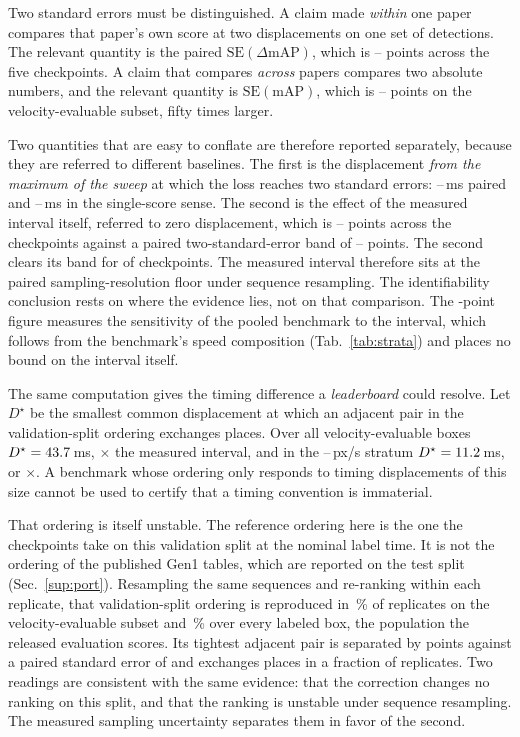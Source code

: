 \documentclass[10pt,twocolumn,letterpaper]{article}
\begin{document}
Two standard errors must be distinguished. A claim made \emph{within} one paper compares
that paper's own score at two displacements on one set of detections. The relevant
quantity is the paired $\mathrm{SE}(\Delta\mathrm{mAP})$, which is \seDmapLo--\seDmapHi{}
points across the five checkpoints. A claim that compares \emph{across} papers compares two
absolute numbers, and the relevant quantity is $\mathrm{SE}(\mathrm{mAP})$, which is
\seMapLo--\seMapHi{} points on the velocity-evaluable subset, fifty times larger.

Two quantities that are easy to conflate are therefore reported separately, because they
are referred to different baselines. The first is the displacement \emph{from the maximum
of the sweep} at which the loss reaches two standard errors: \resPairedLo--\resPairedHi\,ms
paired and \resAbsLo--\resAbsHi\,ms in the single-score sense. The second is the effect of
the measured interval itself, referred to zero displacement, which is
\effTauLo--\effTauHi{} points across the \rankCkpts{} checkpoints against a paired
two-standard-error band of \twoSeDmapLo--\twoSeDmapHi{} points. The second clears its band
for \effTauResolved{} of \rankCkpts{} checkpoints. The measured interval therefore sits at
the paired sampling-resolution floor under sequence resampling. The identifiability conclusion
rests on where the evidence lies, not on that comparison. The
\mapCost{}-point figure measures the sensitivity of the pooled benchmark to the interval,
which follows from the benchmark's speed composition (Tab.~\ref{tab:strata}) and places no bound on
the interval itself.

The same computation gives the timing difference a \emph{leaderboard} could resolve. Let
$D^{\star}$ be the smallest common displacement at which an adjacent pair in the
validation-split ordering exchanges places. Over all velocity-evaluable boxes $D^{\star}=43.7\,$ms,
\dstarAllTau$\times$ the measured interval, and in the \mapCutMid--\mapCutHi\,px/s stratum
$D^{\star}=11.2\,$ms, or \dstarMidTau$\times$. A benchmark whose ordering only responds
to timing displacements of this size cannot be used to certify that a timing convention is
immaterial.

That ordering is itself unstable. The reference ordering here is the one the \rankCkpts{}
checkpoints take on this validation split at the nominal label time. It is not the ordering of
the published Gen1 tables, which are reported on the test split
(Sec.~\ref{sup:port}). Resampling the same \outSeqsScanned{} sequences and re-ranking
within each replicate, that validation-split ordering is reproduced in \rankHoldMov\,\% of
replicates on the velocity-evaluable subset and \rankHoldBox\,\% over every labeled box, the population
the released evaluation scores. Its tightest
adjacent pair is separated by \rankGapMin{} points against a paired standard error of
\rankGapMinSE{} and exchanges places in a fraction \rankFlipMax{} of replicates. Two
readings are consistent with the same evidence: that the correction changes no ranking on
this split, and that the ranking is unstable under sequence resampling. The measured
sampling uncertainty separates them in favor of the second.
\end{document}
